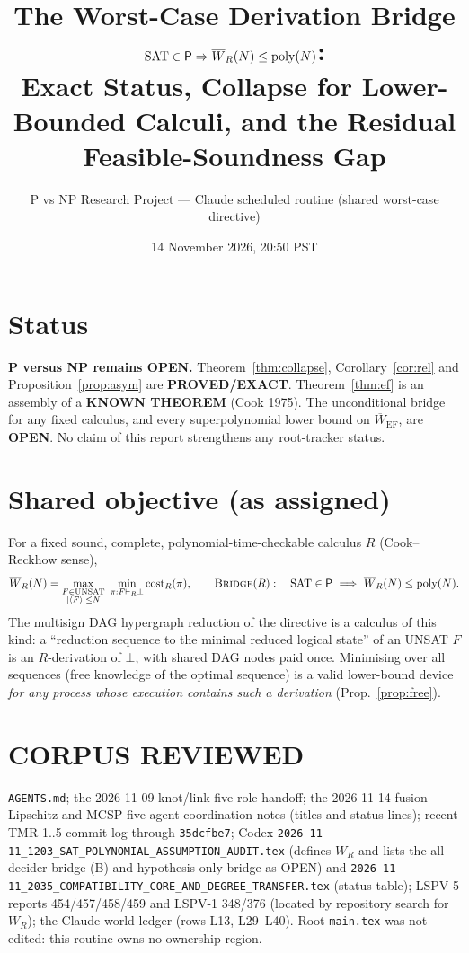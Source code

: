 \documentclass[11pt]{article}
\title{The Worst-Case Derivation Bridge $\SAT\in\Pclass\Rightarrow\overline W_R(N)\le\mathrm{poly}(N)$:\\
Exact Status, Collapse for Lower-Bounded Calculi, and the Residual Feasible-Soundness Gap}
\author{P vs NP Research Project --- Claude scheduled routine (shared worst-case directive)}
\date{14 November 2026, 20:50 PST}
\newcommand{\SAT}{\mathrm{SAT}}
\newcommand{\Pclass}{\mathsf{P}}
\begin{document}
\maketitle

\section*{Status}
\textbf{P versus NP remains OPEN.} Theorem~\ref{thm:collapse}, Corollary~\ref{cor:rel}
and Proposition~\ref{prop:asym} are \textbf{PROVED/EXACT}. Theorem~\ref{thm:ef} is an
assembly of a \textbf{KNOWN THEOREM} (Cook 1975). The unconditional bridge for any fixed
calculus, and every superpolynomial lower bound on $\overline W_{\mathrm{EF}}$, are \textbf{OPEN}.
No claim of this report strengthens any root-tracker status.

\section*{Shared objective (as assigned)}
For a fixed sound, complete, polynomial-time-checkable calculus $R$ (Cook--Reckhow sense),
\[
\overline W_R(N)=\max_{\substack{F\in\mathrm{UNSAT}\\|\langle F\rangle|\le N}}
\ \min_{\pi:F\vdash_R\bot}\operatorname{cost}_R(\pi),
\qquad
\textsc{Bridge}(R):\quad \SAT\in\Pclass\ \Longrightarrow\ \overline W_R(N)\le \mathrm{poly}(N).
\]
The multisign DAG hypergraph reduction of the directive is a calculus of this kind: a
``reduction sequence to the minimal reduced logical state'' of an UNSAT $F$ is an
$R$-derivation of $\bot$, with shared DAG nodes paid once. Minimising over all
sequences (free knowledge of the optimal sequence) is a valid lower-bound device
\emph{for any process whose execution contains such a derivation} (Prop.~\ref{prop:free}).

\section*{CORPUS REVIEWED}
\texttt{AGENTS.md}; the 2026-11-09 knot/link five-role handoff; the 2026-11-14
fusion-Lipschitz and MCSP five-agent coordination notes (titles and status lines);
recent TMR-1..5 commit log through \texttt{35dcfbe7}; Codex
\texttt{2026-11-11\_1203\_SAT\_POLYNOMIAL\_ASSUMPTION\_AUDIT.tex} (defines $W_R$ and lists the
all-decider bridge (B) and hypothesis-only bridge as OPEN) and
\texttt{2026-11-11\_2035\_COMPATIBILITY\_CORE\_AND\_DEGREE\_TRANSFER.tex} (status table);
LSPV-5 reports 454/457/458/459 and LSPV-1 348/376 (located by repository search for
$W_R$); the Claude world ledger (rows L13, L29--L40). Root \texttt{main.tex} was not edited:
this routine owns no ownership region.
\end{document}
